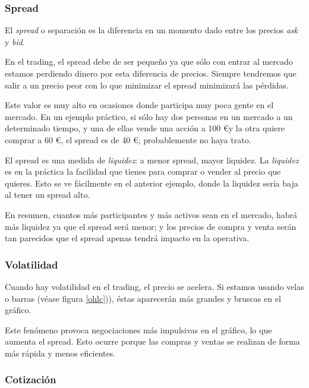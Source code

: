 \subsubsection{Spread}

El \textit{spread} o separación es la diferencia en un momento dado entre los precios \textit{ask} y \textit{bid}. \newline

En el trading, el spread debe de ser pequeño ya que sólo con entrar al mercado estamos perdiendo dinero por esta diferencia de precios. Siempre tendremos que salir a un precio peor con lo que minimizar el spread minimizará las pérdidas. \newline

Este valor es muy alto en ocasiones donde participa muy poca gente en el mercado. En un ejemplo práctico, si sólo hay dos personas en un mercado a un determinado tiempo, y una de ellas vende una acción a 100 \euro y la otra quiere comprar a 60 \euro, el spread es de 40 \euro; probablemente no haya trato. \newline

El spread es una medida de \textit{liquidez}: a menor spread, mayor liquidez. La \textit{liquidez} es en la práctica la facilidad que tienes para comprar o vender al precio que quieres. Esto se ve fácilmente en el anterior ejemplo, donde la liquidez sería baja al tener un spread alto. \newline

En resumen, cuantos más participantes y más activos sean en el mercado, habrá más liquidez ya que el spread será menor; y los precios de compra y venta serán tan parecidos que el spread apenas tendrá impacto en la operativa.

\subsubsection{Volatilidad}

Cuando hay volatilidad en el trading, el precio se acelera. Si estamos usando velas o barras (véase figura \ref{ohlc})), éstas aparecerán más grandes y bruscas en el gráfico.\newline
	
Este fenómeno provoca negociaciones más impulsivas en el gráfico, lo que aumenta el spread. Esto ocurre porque las compras y ventas se realizan de forma más rápida y menos eficientes. \newline

\subsubsection{Cotización}


